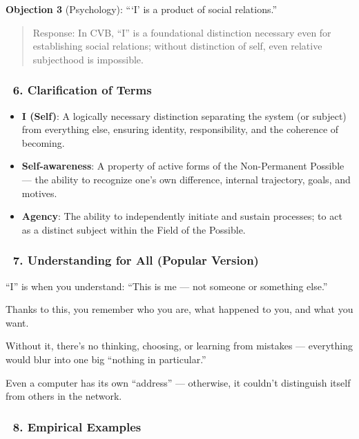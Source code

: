 \documentclass[12pt]{article}
\begin{document}
\textbf{Objection 3} (Psychology): ```I' is a product of social relations.''

\begin{quote}
Response: In CVB, ``I'' is a foundational distinction necessary even for establishing social relations; without distinction of self, even relative subjecthood is impossible.
\end{quote}

\subsubsection*{🔹 6. Clarification of Terms}

\begin{itemize}
\item \textbf{I (Self)}: A logically necessary distinction separating the system (or subject) from everything else, ensuring identity, responsibility, and the coherence of becoming.
\item \textbf{Self-awareness}: A property of active forms of the Non-Permanent Possible — the ability to recognize one’s own difference, internal trajectory, goals, and motives.
\item \textbf{Agency}: The ability to independently initiate and sustain processes; to act as a distinct subject within the Field of the Possible.
\end{itemize}

\subsubsection*{🔹 7. Understanding for All (Popular Version)}

``I'' is when you understand: ``This is me — not someone or something else.''

Thanks to this, you remember who you are, what happened to you, and what you want.

Without it, there’s no thinking, choosing, or learning from mistakes — everything would blur into one big ``nothing in particular.''

Even a computer has its own ``address'' — otherwise, it couldn’t distinguish itself from others in the network.

\subsubsection*{🔹 8. Empirical Examples}
\end{document}
